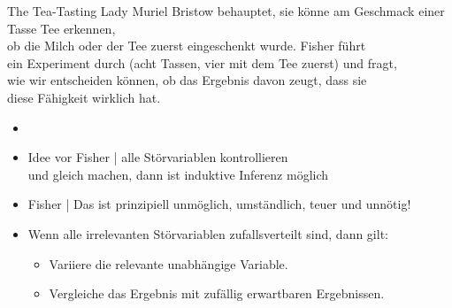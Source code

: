 \begin{frame}
  {The Tea-Tasting Lady}
  Muriel Bristow behauptet, sie könne am Geschmack einer Tasse Tee erkennen,\\
  ob die Milch oder der Tee zuerst eingeschenkt wurde. Fisher führt\\
  ein Experiment durch (acht Tassen, vier mit dem Tee zuerst) und fragt,\\
  wie wir entscheiden können, ob das Ergebnis davon zeugt, dass sie\\
  diese Fähigkeit wirklich hat.\\
  \Halbzeile
  \begin{itemize}[<+->]
    \item {}
      \Halbzeile
    \item Idee vor Fisher | \alert{alle Störvariablen kontrollieren}\\
      und gleich machen, dann ist induktive Inferenz möglich 
    \item Fisher | Das ist prinzipiell unmöglich, umständlich, teuer und \alert{unnötig}!
      \Halbzeile
    \item Wenn alle irrelevanten Störvariablen zufallsverteilt sind, dann gilt:
      \Viertelzeile
      \begin{itemize}[<+->]
	\item Variiere die relevante unabhängige Variable.
          \Viertelzeile
        \item Vergleiche das Ergebnis mit \alert{zufällig erwartbaren Ergebnissen}.
      \end{itemize}
  \end{itemize}
\end{frame}

